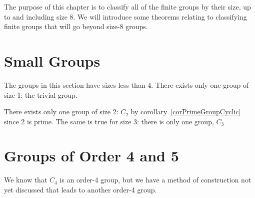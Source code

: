 \documentclass[../Main.tex]{subfiles}
\begin{document}
The purpose of this chapter is to classify all of the finite groups by their size, up to and including size 8. We will introduce some theorems relating to classifying finite groups that will go beyond size-8 groups.
\section{Small Groups}
The groups in this section have sizes less than 4.
There exists only one group of size 1: the trivial group.\par
There exists only one group of size 2: $C_2$ by corollary~\ref{corPrimeGroupCyclic} since 2 is prime. The same is true for size 3: there is only one group, $C_3$
\section{Groups of Order 4 and 5}
We know that $C_4$ is an order-4 group, but we have a method of construction not yet discussed that leads to another order-4 group.
\end{document}
